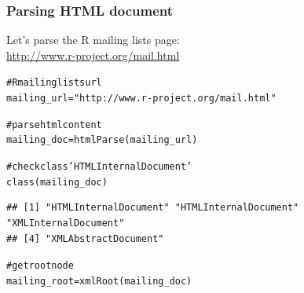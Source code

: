 \documentclass{beamer}\usepackage[]{graphicx}\usepackage[]{color}
\makeatletter
\newcommand{\hlstr}[1]{\textcolor[rgb]{0.063,0.58,0.627}{#1}}%
\newcommand{\hlcom}[1]{\textcolor[rgb]{0.588,0.588,0.588}{#1}}%
\newcommand{\hlstd}[1]{\textcolor[rgb]{0.196,0.196,0.196}{#1}}%
\newcommand{\hlkwb}[1]{\textcolor[rgb]{0.627,0,0.314}{#1}}%
\newcommand{\hlkwd}[1]{\textcolor[rgb]{0.78,0.227,0.412}{#1}}%
\newenvironment{kframe}{%
 \def\at@end@of@kframe{}%
 \ifinner\ifhmode%
  \def\at@end@of@kframe{\end{minipage}}%
  \begin{minipage}{\columnwidth}%
 \fi\fi%
 \def\FrameCommand##1{\hskip\@totalleftmargin \hskip-\fboxsep
 \colorbox{shadecolor}{##1}\hskip-\fboxsep
     \hskip-\linewidth \hskip-\@totalleftmargin \hskip\columnwidth}%
 \MakeFramed {\advance\hsize-\width
   \@totalleftmargin\z@ \linewidth\hsize
   \@setminipage}}%
 {\par\unskip\endMakeFramed%
 \at@end@of@kframe}
\newenvironment{knitrout}{}{} %
\makeatother
\begin{document}
\begin{frame}[fragile]
\frametitle{Parsing HTML document}

Let's parse the R mailing lists page: \\
{\scriptsize \url{http://www.r-project.org/mail.html}}

\begin{knitrout}\tiny
{}\color{fgcolor}\begin{kframe}
\begin{alltt}
\hlcom{# R mailing lists url}
\hlstd{mailing_url} \hlkwb{=} \hlstr{"http://www.r-project.org/mail.html"}

\hlcom{# parse html content}
\hlstd{mailing_doc} \hlkwb{=} \hlkwd{htmlParse}\hlstd{(mailing_url)}
\end{alltt}
\end{kframe}
\end{knitrout}



\begin{knitrout}\tiny
{}\color{fgcolor}\begin{kframe}
\begin{alltt}
\hlcom{# check class 'HTMLInternalDocument'}
\hlkwd{class}\hlstd{(mailing_doc)}
\end{alltt}
\begin{verbatim}
## [1] "HTMLInternalDocument" "HTMLInternalDocument" "XMLInternalDocument" 
## [4] "XMLAbstractDocument"
\end{verbatim}
\begin{alltt}
\hlcom{# get root node}
\hlstd{mailing_root} \hlkwb{=} \hlkwd{xmlRoot}\hlstd{(mailing_doc)}
\end{alltt}
\end{kframe}
\end{knitrout}

\end{frame}

\end{document}
